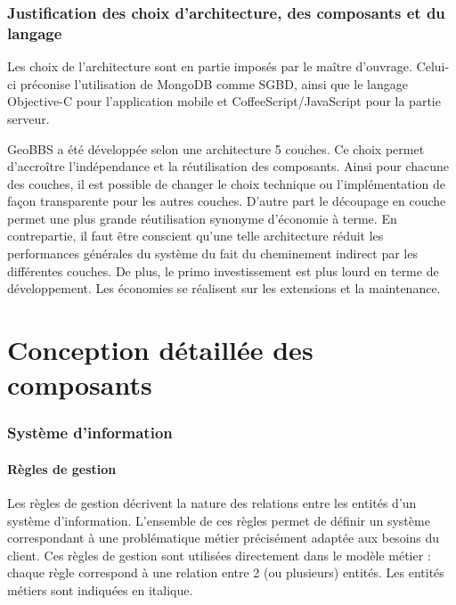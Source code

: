 \documentclass[a4paper,12pt]{report}
\begin{document}
\begin{onehalfspace}
\subsection{Justification des choix d'architecture, des composants et du langage}

  Les choix de l'architecture sont en partie imposés  par le maître d'ouvrage. Celui-ci préconise l'utilisation de MongoDB comme SGBD, ainsi que le langage Objective-C pour l'application mobile et CoffeeScript/JavaScript pour la partie serveur.

  GeoBBS a été développée selon une architecture 5 couches. Ce choix permet d'accroître l'indépendance et la réutilisation des composants. Ainsi pour chacune des couches, il est possible de changer le choix technique ou l'implémentation de façon transparente pour les autres couches. D'autre part le découpage en couche permet une plus grande réutilisation synonyme d'économie à terme. En contrepartie, il faut être conscient qu'une telle architecture réduit les performances générales du système du fait du cheminement indirect par les différentes couches. De plus, le primo investissement est plus lourd en terme de développement. Les économies se réalisent sur les extensions et la maintenance.

\chapter{Conception détaillée des composants}
\subsection{Système d’information}
\subsubsection{Règles de gestion}

  Les règles de gestion décrivent la nature des relations entre les entités d’un système d’information. L’ensemble de ces règles permet de définir un système correspondant à une problématique métier précisément adaptée aux besoins du client. Ces règles de gestion sont utilisées directement dans le modèle métier : chaque règle correspond à une relation  entre 2 (ou plusieurs) entités. Les entités métiers sont indiquées en italique.


\end{onehalfspace}
\end{document}
